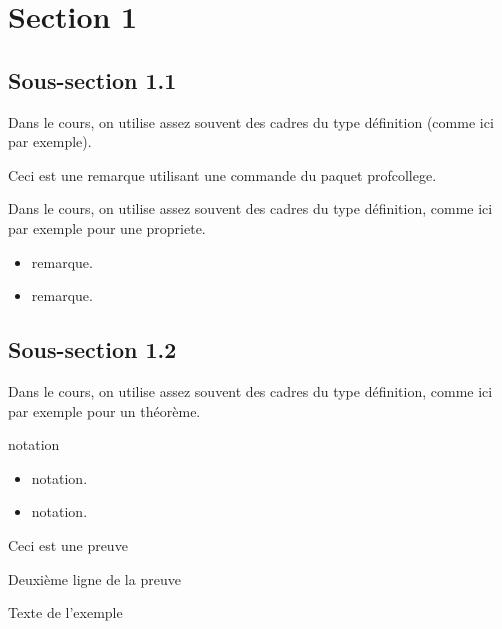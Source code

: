 \section{Section 1}
\subsection{Sous-section 1.1}
\begin{definition}
    Dans le cours, on utilise assez souvent des cadres du type
    définition (comme ici par exemple).    
\end{definition}
\begin{remarque}
    Ceci est une remarque utilisant une commande du paquet profcollege.

    \begin{center}
    \end{center}


\end{remarque}
\begin{propriete}
  Dans le cours, on utilise assez souvent des cadres du type
  définition, comme ici par exemple pour une propriete.
\end{propriete}
\begin{remarques}
  \begin{itemize}
    \item remarque.
    \item remarque.
  \end{itemize}
\end{remarques}

\subsection{Sous-section 1.2}
\begin{theoreme}
  Dans le cours, on utilise assez souvent des cadres du type
  définition, comme ici par exemple pour un théorème.
\end{theoreme}
\begin{notation}
  notation
\end{notation}
\begin{notations}
  \begin{itemize}
    \item notation.
    \item notation.
  \end{itemize}
\end{notations}
\begin{preuve}
  Ceci est une preuve\par Deuxième ligne de la preuve
\end{preuve}
\begin{exemple}
  Texte de l’exemple
  \correction
  
\end{exemple}

